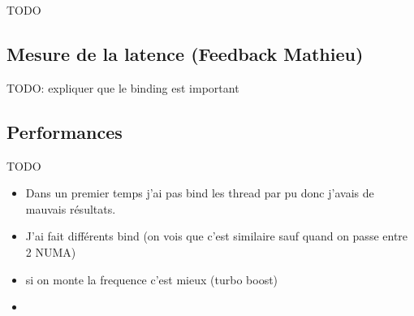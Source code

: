 TODO

\subsection{Mesure de la latence (Feedback Mathieu)}

TODO: expliquer que le binding est important

\subsection{Performances}

TODO

\begin{itemize}
  \item Dans un premier temps j'ai pas bind les thread par pu donc j'avais de mauvais résultats.
  \item J'ai fait différents bind (on vois que c'est similaire sauf quand on passe entre 2 NUMA)
  \item si on monte la frequence c'est mieux (turbo boost)
  \item 
\end{itemize}
